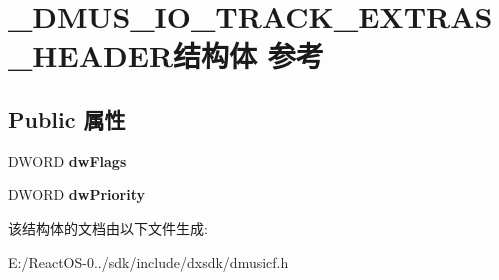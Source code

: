 \hypertarget{struct___d_m_u_s___i_o___t_r_a_c_k___e_x_t_r_a_s___h_e_a_d_e_r}{}\section{\+\_\+\+D\+M\+U\+S\+\_\+\+I\+O\+\_\+\+T\+R\+A\+C\+K\+\_\+\+E\+X\+T\+R\+A\+S\+\_\+\+H\+E\+A\+D\+E\+R结构体 参考}
\label{struct___d_m_u_s___i_o___t_r_a_c_k___e_x_t_r_a_s___h_e_a_d_e_r}
\subsection*{Public 属性}
\begin{DoxyCompactItemize}
\item 
\mbox{\label{struct___d_m_u_s___i_o___t_r_a_c_k___e_x_t_r_a_s___h_e_a_d_e_r_a45494bae1b9463b66c4b9f274346526e}} 
D\+W\+O\+RD {\bfseries dw\+Flags}
\item 
\mbox{\label{struct___d_m_u_s___i_o___t_r_a_c_k___e_x_t_r_a_s___h_e_a_d_e_r_ae227eb91d2a6c6efe0bd6f2c4349fd5c}} 
D\+W\+O\+RD {\bfseries dw\+Priority}
\end{DoxyCompactItemize}


该结构体的文档由以下文件生成\+:\begin{DoxyCompactItemize}
\item 
E\+:/\+React\+O\+S-\/0../sdk/include/dxsdk/dmusicf.\+h\end{DoxyCompactItemize}
